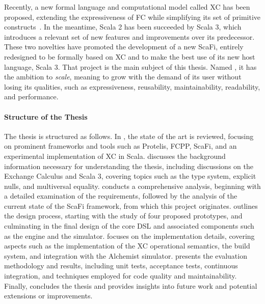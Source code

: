 Recently, a new formal language and computational model called \ac{XC} has been proposed, extending the expressiveness of \ac{FC} while simplifying its set of primitive constructs~\cite{xc}.
%
In the meantime, Scala 2 has been succeeded by Scala 3, which introduces a relevant set of new features and improvements over its predecessor.
%
These two novelties have promoted the development of a new ScaFi, entirely redesigned to be formally based on \ac{XC} and to make the best use of its new host language, Scala 3.
%
That project is the main subject of this thesis.
%
Named \quotes{\this}, it has the ambition to \textit{scale}, meaning to grow with the demand of its user without losing its qualities, such as expressiveness, reusability, maintainability, readability, and performance.


\paragraph{Structure of the Thesis} The thesis is structured as follows.
%
In , the state of the art is reviewed, focusing on prominent frameworks and tools such as Protelis, FCPP, ScaFi, and an experimental implementation of \ac{XC} in Scala.
%
 discusses the background information necessary for understanding the thesis, including discussions on the Exchange Calculus and Scala 3, covering topics such as the type system, explicit nulls, and multiversal equality.
%
 conducts a comprehensive analysis, beginning with a detailed examination of the requirements, followed by the analysis of the current state of the ScaFi framework, from which this project originates.
%
 outlines the design process, starting with the study of four proposed prototypes, and culminating in the final design of the core DSL and associated components such as the engine and the simulator.
%
 focuses on the implementation details, covering aspects such as the implementation of the \ac{XC} operational semantics, the build system, and integration with the Alchemist simulator.
%
 presents the evaluation methodology and results, including unit tests, acceptance tests, continuous integration, and techniques employed for code quality and maintainability.
%
Finally,  concludes the thesis and provides insights into future work and potential extensions or improvements.
